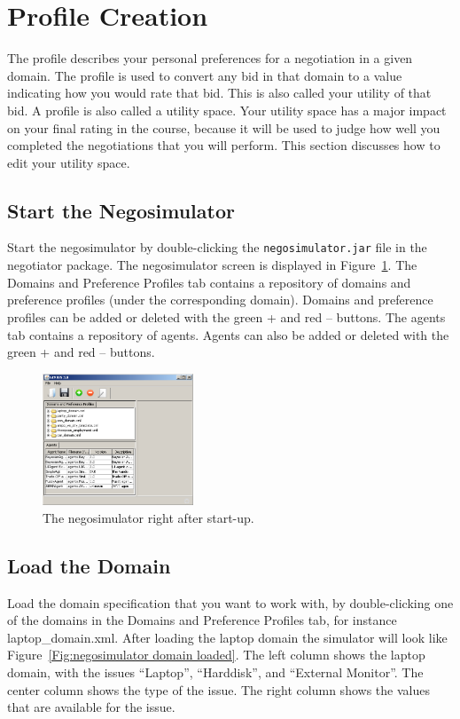 \documentclass[]{article}
\begin{document}
\section{Profile Creation}
The profile describes your personal preferences for a negotiation in a given domain. The profile is used to convert any bid in that domain to a value indicating how you would rate that bid. This is also called your utility of that bid. A profile is also called a utility space. Your utility space has a major impact on your final rating in the course, because it will be used to judge how well you completed the negotiations that you will perform. This section discusses how to edit your utility space.

\subsection{Start the Negosimulator}
Start the negosimulator by double-clicking the \texttt{negosimulator.jar} file in the negotiator package. The negosimulator screen is displayed in Figure~\ref{Fig:negosimulator start}. The Domains and Preference Profiles tab contains a repository of domains and preference profiles (under the corresponding domain). Domains and preference profiles can be added or deleted with the green + and red -- buttons. The agents tab contains a repository of agents. Agents can also be added or deleted with the green + and red -- buttons.

\begin{figure}[htb]
	\centering
	\includegraphics[width=0.4\textwidth]{media/image6.png}
\caption{The negosimulator right after start-up.}\label{Fig:negosimulator start}
\end{figure}

\subsection{Load the Domain}
Load the domain specification that you want to work with, by double-clicking one of the domains in the Domains and Preference Profiles tab, for instance laptop\_domain.xml. After loading the laptop domain the simulator will look like Figure~\ref{Fig:negosimulator domain loaded}. The left column shows the laptop domain, with the issues ``Laptop'', ``Harddisk'', and ``External Monitor''. The center column shows the type of the issue. The right column shows the values that are available for the issue.
\end{document}
